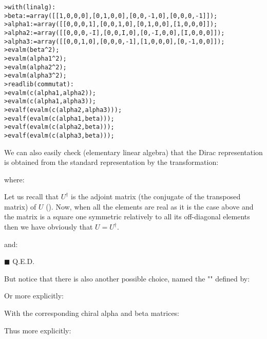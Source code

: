 	\texttt{>with(linalg):\\
	>beta:=array([[1,0,0,0],[0,1,0,0],[0,0,-1,0],[0,0,0,-1]]);\\
	>alpha1:=array([[0,0,0,1],[0,0,1,0],[0,1,0,0],[1,0,0,0]]);\\
	>alpha2:=array([[0,0,0,-I],[0,0,I,0],[0,-I,0,0],[I,0,0,0]]);\\
	>alpha3:=array([[0,0,1,0],[0,0,0,-1],[1,0,0,0],[0,-1,0,0]]);\\
	>evalm(beta\string^2);\\
	>evalm(alpha1\string^2);\\
	>evalm(alpha2\string^2);\\
	>evalm(alpha3\string^2);\\
	>readlib(commutat):\\
	>evalm(c(alpha1,alpha2));\\
	>evalm(c(alpha1,alpha3));\\
	>evalf(evalm(c(alpha2,alpha3)));\\
	>evalf(evalm(c(alpha1,beta)));\\
	>evalf(evalm(c(alpha2,beta)));\\
	>evalf(evalm(c(alpha3,beta)));\\
	}
	
	We can also easily check (elementary linear algebra) that the Dirac representation is obtained from the standard representation by the transformation:
	
	where:
	
	Let us recall that $U^\dagger$ is the adjoint matrix (the conjugate of the transposed matrix) of $U$ (). Now, when all the elements are real as it is the case above and the matrix is a square one symmetric relatively to all its off-diagonal elements then we have obviously that $U=U^\dagger$.
	\begin{dem}
	
	and:
	
	\begin{flushright}
		$\blacksquare$  Q.E.D.
	\end{flushright}
	\end{dem}
	But notice that there is also another possible choice, named the "" defined by:
	
	Or more explicitly:
	
	With the corresponding chiral alpha and beta matrices:
	
	Thus more explicitly:
	
